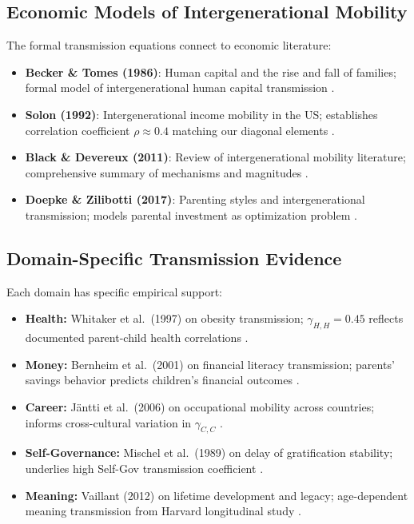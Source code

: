 \subsection{Economic Models of Intergenerational Mobility}

The formal transmission equations connect to economic literature:

\begin{itemize}
\item \textbf{Becker \& Tomes (1986)}: Human capital and the rise and fall of families;
      formal model of intergenerational human capital transmission
      \citep{becker1986human}.

\item \textbf{Solon (1992)}: Intergenerational income mobility in the US;
      establishes correlation coefficient $\rho \approx 0.4$ matching our
      diagonal elements \citep{solon1992intergenerational}.

\item \textbf{Black \& Devereux (2011)}: Review of intergenerational mobility
      literature; comprehensive summary of mechanisms and magnitudes
      \citep{black2011recent}.

\item \textbf{Doepke \& Zilibotti (2017)}: Parenting styles and intergenerational
      transmission; models parental investment as optimization problem
      \citep{doepke2017parenting}.
\end{itemize}

\subsection{Domain-Specific Transmission Evidence}

Each domain has specific empirical support:

\begin{itemize}
\item \textbf{Health:} Whitaker et al.~(1997) on obesity transmission;
      $\gamma_{H,H} = 0.45$ reflects documented parent-child health correlations
      \citep{whitaker1997predicting}.

\item \textbf{Money:} Bernheim et al.~(2001) on financial literacy transmission;
      parents' savings behavior predicts children's financial outcomes
      \citep{bernheim2001education}.

\item \textbf{Career:} Jäntti et al.~(2006) on occupational mobility across countries;
      informs cross-cultural variation in $\gamma_{C,C}$
      \citep{jantti2006american}.

\item \textbf{Self-Governance:} Mischel et al.~(1989) on delay of gratification stability;
      underlies high Self-Gov transmission coefficient \citep{mischel1989delay}.

\item \textbf{Meaning:} Vaillant (2012) on lifetime development and legacy;
      age-dependent meaning transmission from Harvard longitudinal study
      \citep{vaillant2012triumphs}.
\end{itemize}

